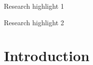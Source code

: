 \documentclass[review,number,sort&compress]{elsarticle}
\begin{document}
\begin{frontmatter}
\begin{abstract}

\end{abstract}

\begin{graphicalabstract}
\end{graphicalabstract}

\begin{highlights}
\item Research highlight 1
\item Research highlight 2
\end{highlights}

\begin{keyword}



\end{keyword}

\end{frontmatter}

\section{Introduction}\label{sec:intro}

%
%   
\end{document}
